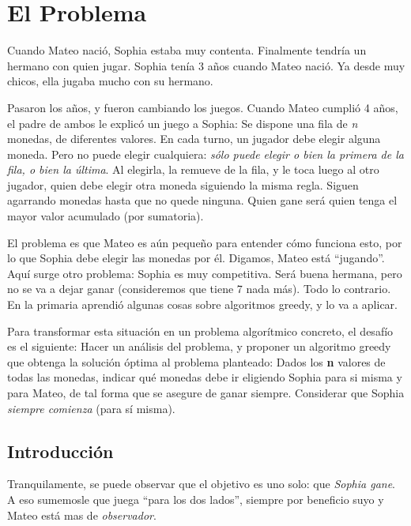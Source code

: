 \section{El Problema}

Cuando Mateo nació, Sophia estaba muy contenta. Finalmente tendría un hermano con quien jugar. Sophia tenía 3 años cuando Mateo nació. Ya desde muy chicos, ella jugaba mucho con su hermano.

Pasaron los años, y fueron cambiando los juegos. Cuando Mateo cumplió 4 años, el padre de ambos le explicó un juego a Sophia: Se dispone una fila de \textit{n} monedas, de diferentes valores. En cada turno, un jugador debe elegir alguna moneda. Pero no puede elegir cualquiera: \textit{sólo puede elegir o bien la primera de la fila, o bien la última}. Al elegirla, la remueve de la fila, y le toca luego al otro jugador, quien debe elegir otra moneda siguiendo la misma regla. Siguen agarrando monedas hasta que no quede ninguna. Quien gane será quien tenga el mayor valor acumulado (por sumatoria).

El problema es que Mateo es aún pequeño para entender cómo funciona esto, por lo que Sophia debe elegir las monedas por él. Digamos, Mateo está “jugando”. Aquí surge otro problema: Sophia es muy competitiva. Será buena hermana, pero no se va a dejar ganar (consideremos que tiene 7 nada más). Todo lo contrario. En la primaria aprendió algunas cosas sobre algoritmos greedy, y lo va a aplicar.

Para transformar esta situación en un problema algorítmico concreto, el desafío es el siguiente:
Hacer un análisis del problema, y proponer un algoritmo greedy que obtenga la solución óptima al problema planteado: Dados los \textbf{n} valores de todas las monedas, indicar qué monedas debe ir eligiendo Sophia para si misma y para Mateo, de tal forma que se asegure de ganar siempre. Considerar que Sophia \textit{siempre comienza} (para sí misma).

\subsection{Introducción}

Tranquilamente, se puede observar que el objetivo es uno solo: que \textit{Sophia gane}. A eso sumemosle que juega ``para los dos lados'', siempre por beneficio suyo y Mateo está mas de \textit{observador}.

